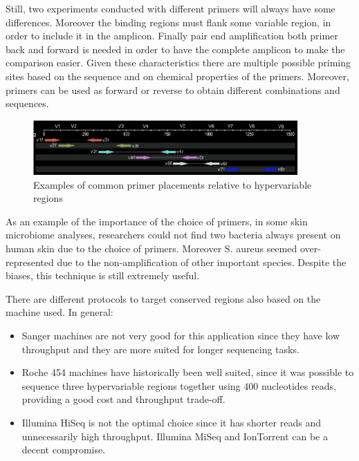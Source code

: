     Still, two experiments conducted with different primers will always have some differences.
    Moreover the binding regions must flank some variable region, in order to include it in the amplicon.
    Finally pair end amplification both primer back and forward is needed in order to have the complete amplicon to make the comparison easier.
    Given these characteristics there are multiple possible priming sites based on the sequence and on chemical properties of the primers.
    Moreover, primers can be used as forward or reverse to obtain different combinations and sequences.

    \begin{figure}[!h]
      \centering
      \includegraphics[width=0.9\textwidth]{primer_placement.png}
      \caption{\label{fig:primer_placement}Examples of common primer placements relative to hypervariable regions}
    \end{figure}

    As an example of the importance of the choice of primers, in some skin microbiome analyses, researchers could not find two bacteria always present on human skin due to the choice of primers.
    Moreover S. aureus seemed over-represented due to the non-amplification of other important species.
    Despite the biases, this technique is still extremely useful.

    There are different protocols to target conserved regions also based on the machine used.
    In general:

    \begin{multicols}{2}
      \begin{itemize}
        \item Sanger machines are not very good for this application since they have low throughput and they are more suited for longer sequencing tasks.
        \item Roche 454 machines have historically been well suited, since it was possible to sequence three hypervariable regions together using $400$ nucleotides reads, providing a good cost and throughput trade-off.
        \item Illumina HiSeq is not the optimal choice since it has shorter reads and unnecessarily high throughput.
          Illumina MiSeq and IonTorrent can be a decent compromise.
      \end{itemize}
    \end{multicols}

